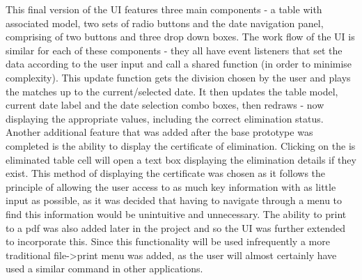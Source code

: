 This final version of the UI features three main components - a table with associated model, 
two sets of radio buttons and the date navigation panel, comprising of two buttons and three
drop down boxes. The work flow of the UI is similar for each of these components - they all 
have event listeners that set the data according to the user input and call a shared function 
(in order to minimise complexity). This update function gets the division chosen
by the user and plays the matches up to the current/selected date. It then updates the table 
model, current date label and the date selection combo boxes, then redraws - now displaying the 
appropriate values, including the correct elimination status. Another additional feature that was
added after the base prototype was completed is the ability to display the certificate of elimination.
Clicking on the is eliminated table cell will open a text box displaying the elimination details 
if they exist. This method of displaying the certificate was chosen as it follows the principle 
of allowing the user access to as much key information with as little input as possible, as it
was decided that having to navigate through a menu to find this information would be unintuitive and 
unnecessary. The ability to print to a pdf was also added later in the project and so the 
UI was further extended to incorporate this. Since this functionality will be
used infrequently a more traditional file->print menu was added, as the user will almost certainly
have used a similar command in other applications.